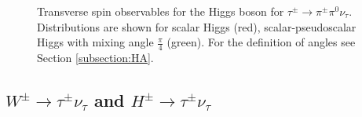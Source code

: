 \documentclass[]{Tauola_interface_design}
\begin{document}
\begin{figure}[h!]
\centering
{} 
\caption{Transverse spin observables for the Higgs boson for 
$\tau^{\pm}\rightarrow \pi^{\pm} \pi^0 \nu_{\tau}$.
Distributions are shown for scalar Higgs (red), scalar-pseudoscalar 
Higgs with mixing angle $\frac{\pi}{4}$ (green). 
For the definition of angles see Section \ref{subsection:HA}.}
\end{figure}

\subsection{$W^{\pm} \rightarrow \tau^{\pm} \nu_{\tau}$ and $H^{\pm} \rightarrow \tau^{\pm} \nu_{\tau}$}
\label{sect:WH}
\end{document}
